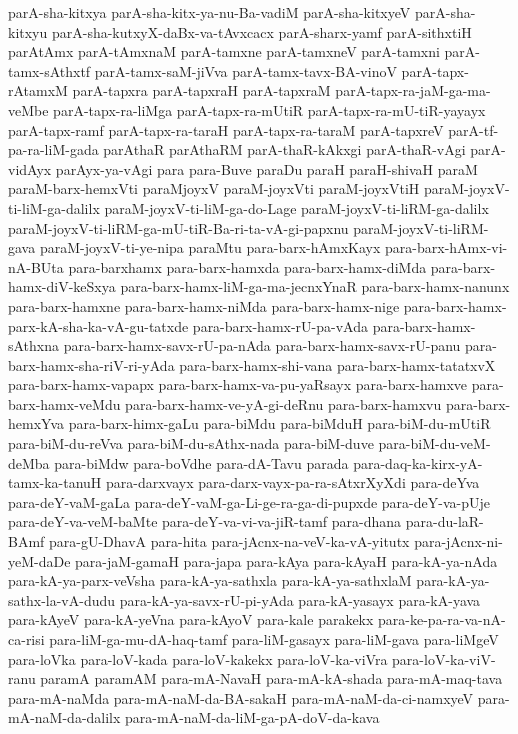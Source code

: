 {parA-sha-kitxya
parA-sha-kitx-ya-nu-Ba-vadiM
parA-sha-kitxyeV
parA-sha-kitxyu
parA-sha-kutxyX-daBx-va-tAvxcacx
parA-sharx-yamf
parA-sithxtiH
parAtAmx
parA-tAmxnaM
parA-tamxne
parA-tamxneV
parA-tamxni
parA-tamx-sAthxtf
parA-tamx-saM-jiVva
parA-tamx-tavx-BA-vinoV
parA-tapx-rAtamxM
parA-tapxra
parA-tapxraH
parA-tapxraM
parA-tapx-ra-jaM-ga-ma-veMbe
parA-tapx-ra-liMga
parA-tapx-ra-mUtiR
parA-tapx-ra-mU-tiR-yayayx
parA-tapx-ramf
parA-tapx-ra-taraH
parA-tapx-ra-taraM
parA-tapxreV
parA-tf-pa-ra-liM-gada
parAthaR
parAthaRM
parA-thaR-kAkxgi
parA-thaR-vAgi
parA-vidAyx
parAyx-ya-vAgi
para
para-Buve
paraDu
paraH
paraH-shivaH
paraM
paraM-barx-hemxVti
paraMjoyxV
paraM-joyxVti
paraM-joyxVtiH
paraM-joyxV-ti-liM-ga-dalilx
paraM-joyxV-ti-liM-ga-do-Lage
paraM-joyxV-ti-liRM-ga-dalilx
paraM-joyxV-ti-liRM-ga-mU-tiR-Ba-ri-ta-vA-gi-papxnu
paraM-joyxV-ti-liRM-gava
paraM-joyxV-ti-ye-nipa
paraMtu
para-barx-hAmxKayx
para-barx-hAmx-vi-nA-BUta
para-barxhamx
para-barx-hamxda
para-barx-hamx-diMda
para-barx-hamx-diV-keSxya
para-barx-hamx-liM-ga-ma-jecnxYnaR
para-barx-hamx-nanunx
para-barx-hamxne
para-barx-hamx-niMda
para-barx-hamx-nige
para-barx-hamx-parx-kA-sha-ka-vA-gu-tatxde
para-barx-hamx-rU-pa-vAda
para-barx-hamx-sAthxna
para-barx-hamx-savx-rU-pa-nAda
para-barx-hamx-savx-rU-panu
para-barx-hamx-sha-riV-ri-yAda
para-barx-hamx-shi-vana
para-barx-hamx-tatatxvX
para-barx-hamx-vapapx
para-barx-hamx-va-pu-yaRsayx
para-barx-hamxve
para-barx-hamx-veMdu
para-barx-hamx-ve-yA-gi-deRnu
para-barx-hamxvu
para-barx-hemxYva
para-barx-himx-gaLu
para-biMdu
para-biMduH
para-biM-du-mUtiR
para-biM-du-reVva
para-biM-du-sAthx-nada
para-biM-duve
para-biM-du-veM-deMba
para-biMdw
para-boVdhe
para-dA-Tavu
parada
para-daq-ka-kirx-yA-tamx-ka-tanuH
para-darxvayx
para-darx-vayx-pa-ra-sAtxrXyXdi
para-deYva
para-deY-vaM-gaLa
para-deY-vaM-ga-Li-ge-ra-ga-di-pupxde
para-deY-va-pUje
para-deY-va-veM-baMte
para-deY-va-vi-va-jiR-tamf
para-dhana
para-du-laR-BAmf
para-gU-DhavA
para-hita
para-jAcnx-na-veV-ka-vA-yitutx
para-jAcnx-ni-yeM-daDe
para-jaM-gamaH
para-japa
para-kAya
para-kAyaH
para-kA-ya-nAda
para-kA-ya-parx-veVsha
para-kA-ya-sathxla
para-kA-ya-sathxlaM
para-kA-ya-sathx-la-vA-dudu
para-kA-ya-savx-rU-pi-yAda
para-kA-yasayx
para-kA-yava
para-kAyeV
para-kA-yeVna
para-kAyoV
para-kale
parakekx
para-ke-pa-ra-va-nA-ca-risi
para-liM-ga-mu-dA-haq-tamf
para-liM-gasayx
para-liM-gava
para-liMgeV
para-loVka
para-loV-kada
para-loV-kakekx
para-loV-ka-viVra
para-loV-ka-viV-ranu
paramA
paramAM
para-mA-NavaH
para-mA-kA-shada
para-mA-maq-tava
para-mA-naMda
para-mA-naM-da-BA-sakaH
para-mA-naM-da-ci-namxyeV
para-mA-naM-da-dalilx
para-mA-naM-da-liM-ga-pA-doV-da-kava
}

